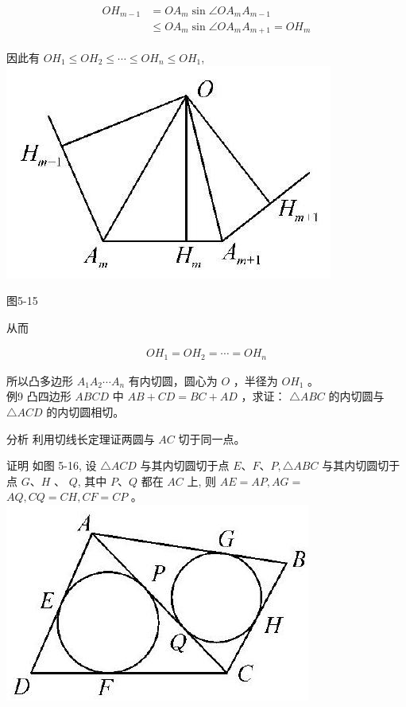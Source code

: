 \documentclass[10pt]{article}
\begin{document}
\begin{align*}
\begin{aligned}
O H_{m-1} & =O A_{m} \sin \angle O A_{m} A_{m-1} \\
& \leqslant O A_{m} \sin \angle O A_{m} A_{m+1}=O H_{m}
\end{aligned}
\end{align*}

因此有 $O H_{1} \leqslant O H_{2} \leqslant \cdots \leqslant O H_{n} \leqslant O H_{1}$,\\
\includegraphics[max width=\textwidth, center]{2024_10_30_66b8e5e701da2093c133g-039}

图5-15

从而

\begin{align*}
O H_{1}=O H_{2}=\cdots=O H_{n}
\end{align*}

所以凸多边形 $A_{1} A_{2} \cdots A_{n}$ 有内切圆，圆心为 $O$ ，半径为 $O H_{1}$ 。\\
例9 凸四边形 $A B C D$ 中 $A B+C D=B C+A D$ ，求证： $\triangle A B C$ 的内切圆与 $\triangle A C D$ 的内切圆相切。

分析 利用切线长定理证两圆与 $A C$ 切于同一点。

证明 如图 5-16, 设 $\triangle A C D$ 与其内切圆切于点 $E 、 F 、 P, \triangle A B C$ 与其内切圆切于点 $G 、 H$ 、 $Q$, 其中 $P 、 Q$ 都在 $A C$ 上, 则 $A E=A P, A G=$ $A Q, C Q=C H, C F=C P$ 。\\
\includegraphics[max width=\textwidth, center]{2024_10_30_66b8e5e701da2093c133g-040}
\end{document}

